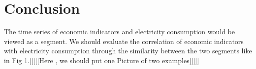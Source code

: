 
\section{Conclusion}
The time series of economic indicators and electricity consumption would be viewed as a segment. We should evaluate the correlation of economic indicators with electricity consumption through the similarity between the two segments like in Fig 1.[[[[[Here , we should  put one Picture of two examples]]]]] 

